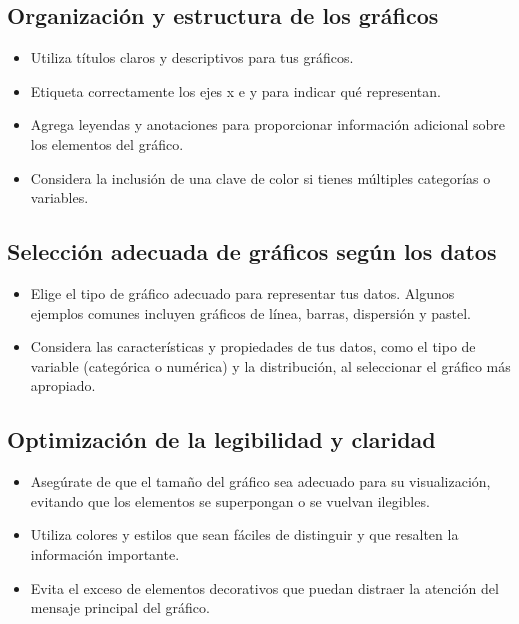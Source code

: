 \documentclass[
  a4paper,
]{article}
\begin{document}
\hypertarget{organizaciuxf3n-y-estructura-de-los-gruxe1ficos}{%
\subsection{Organización y estructura de los
gráficos}\label{organizaciuxf3n-y-estructura-de-los-gruxe1ficos}}

\begin{itemize}
\item
  Utiliza títulos claros y descriptivos para tus gráficos.
\item
  Etiqueta correctamente los ejes x e y para indicar qué representan.
\item
  Agrega leyendas y anotaciones para proporcionar información adicional
  sobre los elementos del gráfico.
\item
  Considera la inclusión de una clave de color si tienes múltiples
  categorías o variables.
\end{itemize}

\hypertarget{selecciuxf3n-adecuada-de-gruxe1ficos-seguxfan-los-datos}{%
\subsection{Selección adecuada de gráficos según los
datos}\label{selecciuxf3n-adecuada-de-gruxe1ficos-seguxfan-los-datos}}

\begin{itemize}
\item
  Elige el tipo de gráfico adecuado para representar tus datos. Algunos
  ejemplos comunes incluyen gráficos de línea, barras, dispersión y
  pastel.
\item
  Considera las características y propiedades de tus datos, como el tipo
  de variable (categórica o numérica) y la distribución, al seleccionar
  el gráfico más apropiado.
\end{itemize}

\hypertarget{optimizaciuxf3n-de-la-legibilidad-y-claridad}{%
\subsection{Optimización de la legibilidad y
claridad}\label{optimizaciuxf3n-de-la-legibilidad-y-claridad}}

\begin{itemize}
\item
  Asegúrate de que el tamaño del gráfico sea adecuado para su
  visualización, evitando que los elementos se superpongan o se vuelvan
  ilegibles.
\item
  Utiliza colores y estilos que sean fáciles de distinguir y que
  resalten la información importante.
\item
  Evita el exceso de elementos decorativos que puedan distraer la
  atención del mensaje principal del gráfico.
\end{itemize}
\end{document}
